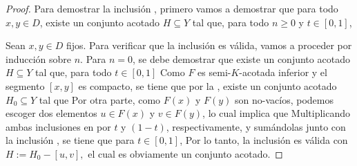 \begin{proof}
Para demostrar la inclusión , primero vamos a demostrar que para todo $x,y\in D$,
existe un conjunto acotado $H\subseteq Y$ tal que, para todo $n\geq 0$ y $t\in[0,1]$, 

Sean $x,y\in D$ fijos. Para verificar que la inclusión  es válida, 
vamos a proceder por inducción sobre $n$. Para $n=0$, se debe demostrar
que existe un conjunto acotado $H\subseteq Y$ tal que, para todo $t\in[0,1]$
Como $F$ es semi-$K$-acotada inferior y el segmento $[x,y]$ es compacto, se tiene
que por la , existe un conjunto acotado $H_0\subseteq Y$ 
tal que 
Por otra parte, como $F(x)$ y $F(y)$ son no-vacíos, podemos escoger dos elementos
$u\in F(x)$ y $v\in F(y)$, lo cual implica que
Multiplicando ambas inclusiones en  por $t$ y $(1-t)$, respectivamente, y sumándolas
junto con la inclusión , se tiene que para $t\in[0,1]$, 
Por lo tanto, la inclusión  es válida con $H := H_0-[u,v],$ el cual es obviamente 
un conjunto acotado.


\end{proof}
